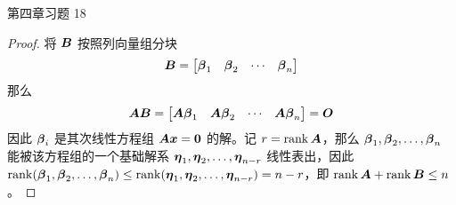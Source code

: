 \begin{problem}
	第四章习题 18
	
	\begin{proof}
		将 $\boldsymbol{B}$ 按照列向量组分块
		$$
		\boldsymbol{B} = \begin{bmatrix}
			\boldsymbol{\beta}_1 & \boldsymbol{\beta}_2 & \cdots & \boldsymbol{\beta}_n
		\end{bmatrix}
		$$
		那么
		$$
		\boldsymbol{A} \boldsymbol{B} = \begin{bmatrix}
			\boldsymbol{A} \boldsymbol{\beta}_1 & \boldsymbol{A} \boldsymbol{\beta}_2 & \cdots & \boldsymbol{A} \boldsymbol{\beta}_n
		\end{bmatrix} = \boldsymbol{O}
		$$
		因此 $\boldsymbol{\beta}_i$ 是其次线性方程组 $\boldsymbol{A} \boldsymbol{x} = \boldsymbol{0}$ 的解。记 $r = \operatorname{rank} \boldsymbol{A}$，那么 $\boldsymbol{\beta}_1, \boldsymbol{\beta}_2, \dots, \boldsymbol{\beta}_n$ 能被该方程组的一个基础解系 $\boldsymbol{\eta}_1, \boldsymbol{\eta}_2, \dots, \boldsymbol{\eta}_{n-r}$ 线性表出，因此 $\operatorname{rank}(\boldsymbol{\beta}_1, \boldsymbol{\beta}_2, \dots, \boldsymbol{\beta}_n) \le \operatorname{rank}(\boldsymbol{\eta}_1, \boldsymbol{\eta}_2, \dots, \boldsymbol{\eta}_{n-r}) = n - r$，即 $\operatorname{rank} \boldsymbol{A} + \operatorname{rank} \boldsymbol{B} \le n$。
	\end{proof}
\end{problem}